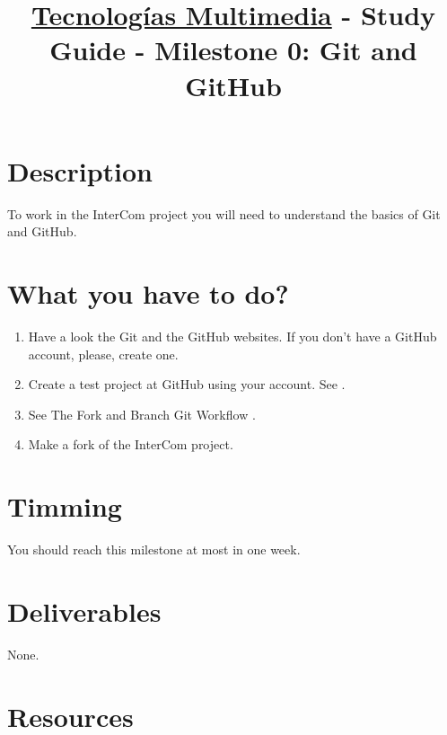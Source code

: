\title{\href{https://www.ual.es/estudios/grados/presentacion/plandeestudios/asignatura/4015/40154321?idioma=zh_CN}{Tecnologías Multimedia} - Study Guide - Milestone 0: Git and GitHub}

\maketitle

\section{Description}

To work in the InterCom project \cite{intercom} you will need to
understand the basics of Git and GitHub.

\section{What you have to do?}

\begin{enumerate}
\item Have a look the Git \cite{Git, Git-book} and the GitHub
  \cite{GitHub} websites. If you don't have a GitHub account, please,
  create one.
\item Create a test project at GitHub using your account. See
  \cite{GitHub-HW}.
\item See The Fork and Branch Git Workflow \cite{Git-workflow}.
\item Make a fork of the InterCom \cite{intercom} project. 
\end{enumerate}

\section{Timming}

You should reach this milestone at most in one week.

\section{Deliverables}

None.

\section{Resources}


